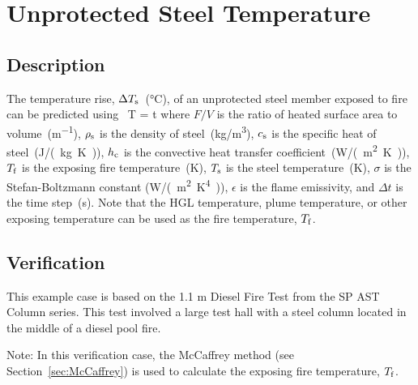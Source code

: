 \section{Unprotected Steel Temperature}
\label{sec:Unprotected_Steel_Temperature}

\subsection*{Description}

The temperature rise, $\Delta T\sb{s}$~(\si{\celsius}), of an unprotected steel member exposed to fire can be predicted using~\cite{SFPE:Milke2}
\be
\Delta T =    \Delta t
\label{eq:unprotected_steel}
\ee
where $F/V$ is the ratio of heated surface area to volume~(\si{m^{-1}}), $\rho\sb{s}$ is the density of steel~(\si{kg/m^3}), $c\sb{s}$ is the specific heat of steel~(\si{J/(kg.K)}), $h\sb{c}$ is the convective heat transfer coefficient~(\si{W/(m^2.K)}), $T\sb{f}$ is the exposing fire temperature~(\si{K}), $T\sb{s}$ is the steel temperature~(\si{K}), $\sigma$ is the Stefan-Boltzmann constant (\si{W/(m^2.K^4)}), $\epsilon$ is the flame emissivity, and $\Delta t$ is the time step~(\si{s}). Note that the HGL temperature, plume temperature, or other exposing temperature can be used as the fire temperature, $T\sb{f}$.


\clearpage


\subsection*{Verification}

This example case is based on the 1.1 m Diesel Fire Test from the SP AST Column series. This test involved a large test hall with a steel column located in the middle of a diesel pool fire.

Note: In this verification case, the McCaffrey method (see Section~\ref{sec:McCaffrey}) is used to calculate the exposing fire temperature, $T\sb{f}$.


